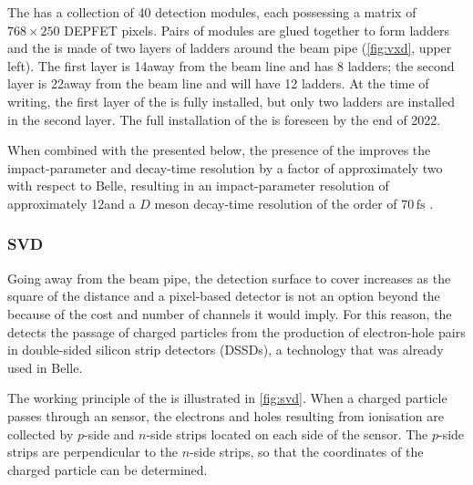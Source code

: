 The \PXD has a collection of 40 detection modules, each possessing a matrix of $768\times250$ DEPFET pixels.
Pairs of modules are glued together to form ladders and the \PXD is made of two layers of ladders around the beam pipe (\cref{fig:vxd}, upper left).
The first layer is 14\mm away from the beam line and has 8 ladders; the second layer is 22\mm away from the beam line and will have 12 ladders.
At the time of writing, the first layer of the \PXD is fully installed, but only two ladders are installed in the second layer.
The full installation of the \PXD is foreseen by the end of 2022.

When combined with the \SVD presented below, the presence of the \PXD improves the impact-parameter and decay-time resolution by a factor of approximately two with respect to Belle, resulting in an impact-parameter resolution of approximately 12\mum and a $D$ meson decay-time resolution of the order of $70\,\mathrm{fs}$ \cite{Belle-II:2021cxx}.


\subsubsection*{SVD}

Going away from the beam pipe, the detection surface to cover increases as the square of the distance and a pixel-based detector is not an option beyond the \PXD because of the cost and number of channels it would imply.
For this reason, the \SVD detects the passage of charged particles from the production of electron-hole pairs in double-sided silicon strip detectors (DSSDs), a technology that was already used in Belle.

The working principle of the \SVD is illustrated in \cref{fig:svd}.
When a charged particle passes through an \SVD sensor, the electrons and holes resulting from ionisation are collected by $p$-side and $n$-side strips located on each side of the sensor.
The $p$-side strips are perpendicular to the $n$-side strips, so that the coordinates of the charged particle can be determined.

